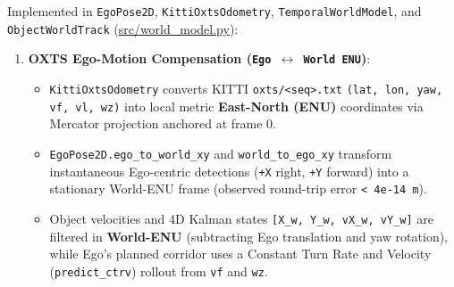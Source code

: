 \documentclass[10.5pt,a4paper]{article}
\begin{document}
Implemented in \texttt{EgoPose2D}, \texttt{KittiOxtsOdometry}, \texttt{TemporalWorldModel}, and \texttt{ObjectWorldTrack} (\href{https://github.com/Heisnotanimposter/Totalcare\_autonomous\_driving\_Yolov5/blob/main/src/world\_model.py}{src/world\_model.py}):


\begin{enumerate}[leftmargin=1.8em,itemsep=2pt]
\item \textbf{OXTS Ego-Motion Compensation (\texttt{Ego $\leftrightarrow$ World ENU})}:
\begin{itemize}[leftmargin=1.5em,itemsep=2pt]
\item \texttt{KittiOxtsOdometry} converts KITTI \texttt{oxts/\allowbreak{}<seq>.\allowbreak{}txt} \texttt{(lat,\allowbreak{} lon,\allowbreak{} yaw,\allowbreak{} vf,\allowbreak{} vl,\allowbreak{} wz)} into local metric \textbf{East-North (ENU)} coordinates via Mercator projection anchored at frame 0.
\item \texttt{EgoPose2D.\allowbreak{}ego\_\allowbreak{}to\_\allowbreak{}world\_\allowbreak{}xy} and \texttt{world\_\allowbreak{}to\_\allowbreak{}ego\_\allowbreak{}xy} transform instantaneous Ego-centric detections (\texttt{+X} right, \texttt{+Y} forward) into a stationary World-ENU frame (observed round-trip error \texttt{< 4e-\allowbreak{}14 m}).
\item Object velocities and 4D Kalman states \texttt{[X\_\allowbreak{}w,\allowbreak{} Y\_\allowbreak{}w,\allowbreak{} vX\_\allowbreak{}w,\allowbreak{} vY\_\allowbreak{}w]} are filtered in \textbf{World-ENU} (subtracting Ego translation and yaw rotation), while Ego's planned corridor uses a Constant Turn Rate and Velocity (\texttt{predict\_\allowbreak{}ctrv}) rollout from \texttt{vf} and \texttt{wz}.
\end{itemize}
\end{enumerate}
\end{document}

